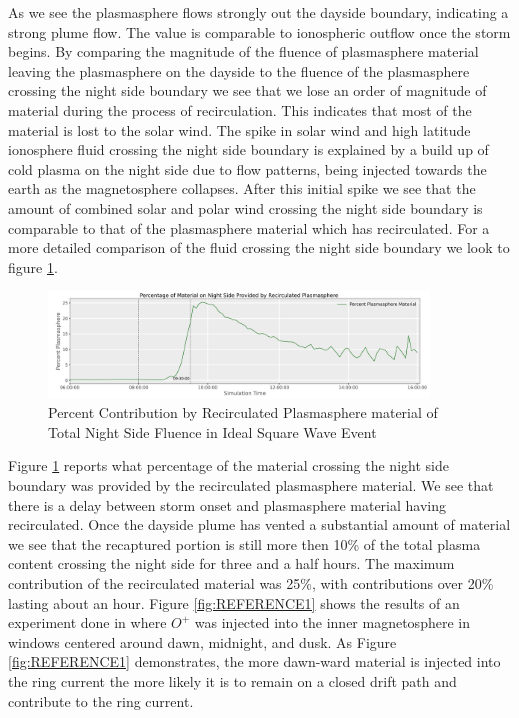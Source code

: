\documentclass[utf8]{frontiersinFPHY_FAMS}
\begin{document}
As we see the plasmasphere flows strongly out the dayside boundary, indicating a strong plume flow. %
The value is comparable to ionospheric outflow once the storm begins. By comparing the magnitude of the fluence of plasmasphere material leaving the plasmasphere on the dayside to the fluence of the plasmasphere crossing the night side boundary we see that we lose an order of magnitude of material during the process of recirculation. This indicates that most of the material is lost to the solar wind. The spike in solar wind and high latitude ionosphere fluid crossing the night side boundary is explained by a build up of cold plasma on the night side due to flow patterns, being injected towards the earth as the magnetosphere collapses. After this initial spike we see that the amount of combined solar and polar wind crossing the night side boundary is comparable to that of the plasmasphere material which has recirculated. For a more detailed comparison of the fluid crossing the night side boundary we look to figure \ref{fig:RESULT2}. 

\begin{figure}[!ht]
\begin{center}
\includegraphics[width=0.9\textwidth]{PrecentPlasNightSide.png}
\caption{Percent Contribution by Recirculated Plasmasphere material of Total Night Side Fluence in Ideal Square Wave Event}
\label{fig:RESULT2}
\end{center}
\end{figure}

Figure \ref{fig:RESULT2} reports what percentage of the material crossing the night side boundary was provided by the recirculated plasmasphere material. We see that there is a delay between storm onset and plasmasphere material having recirculated. Once the dayside plume has vented a substantial amount of material we see that the recaptured portion is still more then 10\% of the total plasma content crossing the night side for three and a half hours. The maximum contribution of the recirculated material was 25\%, with contributions over 20\% lasting about an hour. Figure \ref{fig:REFERENCE1} shows the results of an experiment done in \citet[Welling et al.(2011)]{Welling2011} where $O^{+}$ was injected into the inner magnetosphere in windows centered around dawn, midnight, and dusk. As Figure \ref{fig:REFERENCE1} demonstrates, the more dawn-ward material is injected into the ring current the more likely it is to remain on a closed drift path and contribute to the ring current. 
\end{document}
